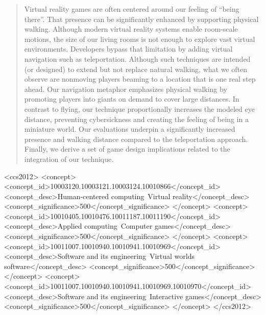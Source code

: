 \documentclass{sigchi}
\begin{document}
\maketitle

\begin{abstract}
Virtual reality games are often centered around our feeling of ``being there''. That presence can be significantly enhanced by supporting physical walking. Although modern virtual reality systems enable room-scale motions, the size of our living rooms is not enough to explore vast virtual environments. Developers bypass that limitation by adding virtual navigation such as teleportation. Although such techniques are intended (or designed) to extend but not replace natural walking, what we often observe are nonmoving players beaming to a location that is one real step ahead. Our navigation metaphor emphasizes physical walking by promoting players into giants on demand to cover large distances. In contrast to flying, our technique proportionally increases the modeled eye distance, preventing cybersickness and creating the feeling of being in a miniature world. Our evaluations underpin a significantly increased presence and walking distance compared to the teleportation approach. Finally, we derive a set of game design implications related to the integration of our technique.

\end{abstract}


\begin{CCSXML}
<ccs2012>
<concept>
<concept_id>10003120.10003121.10003124.10010866</concept_id>
<concept_desc>Human-centered computing~Virtual reality</concept_desc>
<concept_significance>500</concept_significance>
</concept>
<concept>
<concept_id>10010405.10010476.10011187.10011190</concept_id>
<concept_desc>Applied computing~Computer games</concept_desc>
<concept_significance>500</concept_significance>
</concept>
<concept>
<concept_id>10011007.10010940.10010941.10010969</concept_id>
<concept_desc>Software and its engineering~Virtual worlds software</concept_desc>
<concept_significance>500</concept_significance>
</concept>
<concept>
<concept_id>10011007.10010940.10010941.10010969.10010970</concept_id>
<concept_desc>Software and its engineering~Interactive games</concept_desc>
<concept_significance>500</concept_significance>
</concept>
</ccs2012>
\end{CCSXML}

\end{document}
